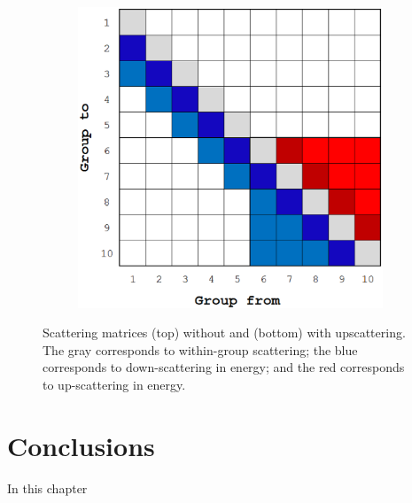 \begin{figure}
\begin{subfigure}[b]{0.58\textwidth}
		\includegraphics[width=\textwidth]{figures/sec_Sn/scattering_matrix_w_upscattering.eps}
	\end{subfigure}
\caption[Scattering matrices with and without upscattering]{Scattering matrices (top) without and (bottom) with upscattering. The gray corresponds to within-group scattering; the blue corresponds to down-scattering in energy; and the red corresponds to up-scattering in energy.}
\label{fig::Sn_BF_scattering_matrix}
\end{figure}

\section{Conclusions}
\label{sec::Sn_Conclusions}

In this chapter